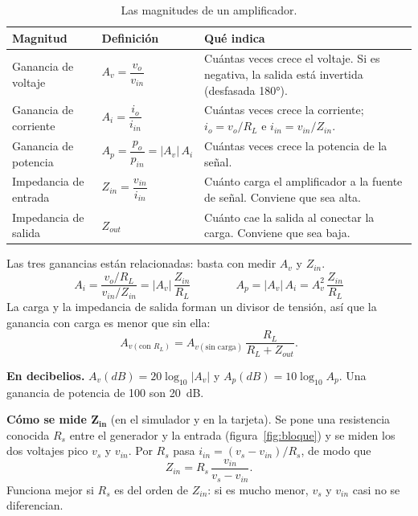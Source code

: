 \documentclass[11pt,a4paper]{article}
\begin{document}
\begin{table}[H]
  \centering
  \renewcommand{\arraystretch}{2.0}
  \begin{tabularx}{\linewidth}{|>{\raggedright\arraybackslash}m{4.2cm}|>{\centering\arraybackslash}m{3.6cm}|>{\raggedright\arraybackslash}X|}
    \hline
    \textbf{Magnitud} & \textbf{Definición} & \textbf{Qué indica} \\ \hline
    Ganancia de voltaje & $A_v = \dfrac{v_o}{v_{in}}$ & Cuántas veces crece el voltaje. Si es
      negativa, la salida está invertida (desfasada \ang{180}). \\ \hline
    Ganancia de corriente & $A_i = \dfrac{i_o}{i_{in}}$ & Cuántas veces crece la corriente;
      $i_o = v_o/R_L$ e $i_{in} = v_{in}/Z_{in}$. \\ \hline
    Ganancia de potencia & $A_p = \dfrac{p_o}{p_{in}} = |A_v|\,A_i$ & Cuántas veces crece la
      potencia de la señal. \\ \hline
    Impedancia de entrada & $Z_{in} = \dfrac{v_{in}}{i_{in}}$ & Cuánto carga el amplificador a
      la fuente de señal. Conviene que sea alta. \\ \hline
    Impedancia de salida & $Z_{out}$ & Cuánto cae la salida al conectar la carga. Conviene que
      sea baja. \\ \hline
  \end{tabularx}
  \caption{Las magnitudes de un amplificador.}
  \label{tab:magnitudes}
\end{table}

\noindent Las tres ganancias están relacionadas: basta con medir $A_v$ y $Z_{in}$.
\begin{equation}
  A_i = \frac{v_o/R_L}{v_{in}/Z_{in}} = |A_v|\,\frac{Z_{in}}{R_L}
  \qquad\qquad
  A_p = |A_v|\,A_i = A_v^2\,\frac{Z_{in}}{R_L}
  \label{eq:aiap}
\end{equation}
\noindent La carga y la impedancia de salida forman un divisor de tensión, así que la ganancia
con carga es menor que sin ella:
\begin{equation}
  A_{v(\text{con } R_L)} = A_{v(\text{sin carga})}\,\frac{R_L}{R_L + Z_{out}}.
  \label{eq:divisor}
\end{equation}

\noindent\textbf{En decibelios.} $A_v(\unit{dB}) = 20\log_{10}|A_v|$ y
$A_p(\unit{dB}) = 10\log_{10} A_p$. Una ganancia de potencia de 100 son \qty{20}{dB}.

\noindent\textbf{Cómo se mide $\boldsymbol{Z_{in}}$} (en el simulador y en la tarjeta). Se pone
una resistencia conocida $R_s$ entre el generador y la entrada (figura~\ref{fig:bloque}) y se
miden los dos voltajes pico $v_s$ y $v_{in}$. Por $R_s$ pasa $i_{in} = (v_s - v_{in})/R_s$,
de modo que
\begin{equation}
  Z_{in} = R_s\,\frac{v_{in}}{v_s - v_{in}}.
  \label{eq:zin}
\end{equation}
Funciona mejor si $R_s$ es del orden de $Z_{in}$: si es mucho menor, $v_s$ y $v_{in}$ casi no
se diferencian.
\end{document}
